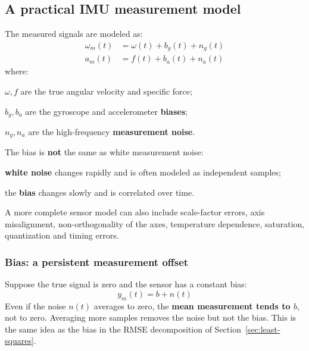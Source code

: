 \subsection{A practical IMU measurement model}\label{sec:imu-model}
The measured signals are modeled as:
\[
\begin{aligned}
\omega_m(t) &= \omega(t) + b_g(t) + n_g(t)\\
a_m(t) &= f(t) + b_a(t) + n_a(t)
\end{aligned}
\]
where:
\begin{compactitemize}
    \item $\omega, f$ are the true angular velocity and specific force;
    \item $b_g, b_a$ are the gyroscope and accelerometer \textbf{biases};
    \item $n_g, n_a$ are the high-frequency \textbf{measurement noise}.
\end{compactitemize}

The bias is \textbf{not} the same as white measurement noise:
\begin{compactitemize}
    \item \textbf{white noise} changes rapidly and is often modeled as independent samples;
    \item the \textbf{bias} changes slowly and is correlated over time.
\end{compactitemize}

A more complete sensor model can also include scale-factor errors, axis misalignment, non-orthogonality of the axes, temperature dependence, saturation, quantization and timing errors.

\subsubsection{Bias: a persistent measurement offset}
Suppose the true signal is zero and the sensor has a constant bias:
\[
y_m(t) = b + n(t)
\]
Even if the noise $n(t)$ averages to zero, the \textbf{mean measurement tends to $b$}, not to zero. Averaging more samples removes the noise but not the bias. This is the same idea as the bias in the RMSE decomposition of Section~\ref{sec:least-squares}.

